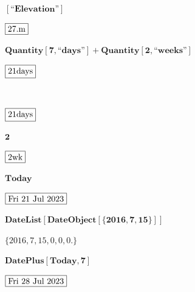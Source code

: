 \documentclass{article}
\begin{document}
\begin{doublespace}
\noindent\(\pmb{[\text{{``}Elevation{''}}]}\)
\end{doublespace}

\begin{doublespace}
\noindent\(\fbox{$27.\text{m}$}\)
\end{doublespace}

\begin{doublespace}
\noindent\(\pmb{\text{Quantity}[7,\text{{``}days{''}}]+\text{Quantity}[2,\text{{``}weeks{''}}]}\)
\end{doublespace}

\begin{doublespace}
\noindent\(\fbox{$21\text{days}$}\)
\end{doublespace}

\(\)

\begin{doublespace}
\noindent\(\fbox{$21\text{days}$}\)
\end{doublespace}

\begin{doublespace}
\noindent\(\pmb{2}\)
\end{doublespace}

\begin{doublespace}
\noindent\(\fbox{$2\text{wk}$}\)
\end{doublespace}

\begin{doublespace}
\noindent\(\pmb{\text{Today}}\)
\end{doublespace}

\begin{doublespace}
\noindent\(\fbox{$\text{Fri 21 Jul 2023}$}\)
\end{doublespace}

\begin{doublespace}
\noindent\(\pmb{\text{DateList}[\text{DateObject}[\{2016,7,15\}]]}\)
\end{doublespace}

\begin{doublespace}
\noindent\(\{2016,7,15,0,0,0.\}\)
\end{doublespace}

\begin{doublespace}
\noindent\(\pmb{\text{DatePlus}[\text{Today},7]}\)
\end{doublespace}

\begin{doublespace}
\noindent\(\fbox{$\text{Fri 28 Jul 2023}$}\)
\end{doublespace}
\end{document}
